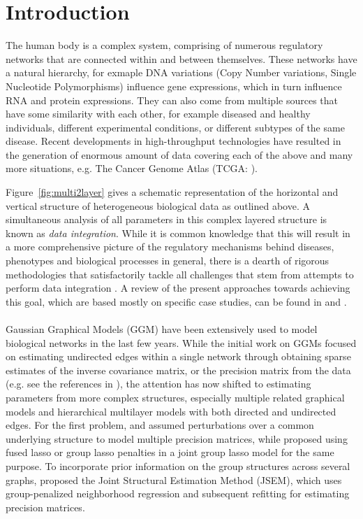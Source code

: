 \section{Introduction}
The human body is a complex system, comprising of numerous regulatory networks that are connected within and between themselves. These networks have a natural hierarchy, for exmaple DNA variations (Copy Number variations, Single Nucleotide Polymorphisms) influence gene expressions, which in turn influence RNA and protein expressions. They can also come from multiple sources that have some similarity with each other, for example diseased and healthy individuals, different experimental conditions, or different subtypes of the same disease. Recent developments in high-throughput technologies have resulted in the generation of enormous amount of data covering each of the above and many more situations, e.g. The Cancer Genome Atlas (TCGA: \cite{Tomczak15}).

Figure~\ref{fig:multi2layer} gives a schematic representation of the horizontal and vertical structure of heterogeneous biological data as outlined above. A simultaneous analysis of all parameters in this complex layered structure is known as {\it data integration}. While it is common knowledge that this will result in a more comprehensive picture of the regulatory mechanisms behind diseases, phenotypes and biological processes in general, there is a dearth of rigorous methodologies that satisfactorily tackle all challenges that stem from attempts to perform data integration \citep{GomezCabreroEtal14,JoycePalsson06,GligPrzulj15}. A review of the present approaches towards achieving this goal, which are based mostly on specific case studies, can be found in \cite{GligPrzulj15} and \cite{ZhangOuyangZhao17}.

\paragraph{}
Gaussian Graphical Models (GGM) have been extensively used to model biological networks in the last few years. While the initial work on GGMs focused on estimating undirected edges within a single network through obtaining sparse estimates of the inverse covariance matrix, or the precision matrix from the data (e.g. see the references in \cite{BuhlmannvandeGeer11}), the attention has now shifted to estimating parameters from more complex structures, especially multiple related graphical models and hierarchical multilayer models with both directed and undirected edges. For the first problem, \cite{GuoEtal11} and \cite{XieLiuValdar16} assumed perturbations over a common underlying structure to model multiple precision matrices, while \cite{DanaherEtal14} proposed using fused lasso or group lasso penalties in a joint group lasso model for the same purpose. To incorporate prior information on the group structures across several graphs, \cite{MaMichailidis15} proposed the Joint Structural Estimation Method (JSEM), which uses group-penalized neighborhood regression and subsequent refitting for estimating precision matrices.

